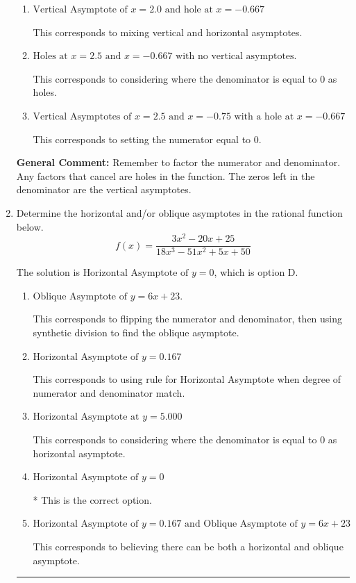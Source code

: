 \documentclass{extbook}[14pt]
\newcommand{\litem}[1]{\item #1

\rule{\textwidth}{0.4pt}}
\begin{document}
\begin{enumerate}
{\begin{enumerate}[label=\Alph*.]
This is the correct answer.
\item \( \text{Vertical Asymptote of } x = 2.0 \text{ and hole at } x = -0.667 \)

This corresponds to mixing vertical and horizontal asymptotes.
\item \( \text{Holes at } x = 2.5 \text{ and } x = -0.667 \text{ with no vertical asymptotes.} \)

This corresponds to considering where the denominator is equal to 0 as holes.
\item \( \text{Vertical Asymptotes of } x = 2.5 \text{ and } x = -0.75 \text{ with a hole at } x = -0.667 \)

This corresponds to setting the numerator equal to 0.
\end{enumerate}

\textbf{General Comment:} Remember to factor the numerator and denominator. Any factors that cancel are holes in the function. The zeros left in the denominator are the vertical asymptotes.
}
\litem{
Determine the horizontal and/or oblique asymptotes in the rational function below.
\[ f(x) = \frac{3x^{2} -20 x + 25}{18x^{3} -51 x^{2} +5 x + 50} \]

The solution is \( \text{Horizontal Asymptote of } y = 0 \), which is option D.\begin{enumerate}[label=\Alph*.]
\item \( \text{Oblique Asymptote of } y = 6x + 23. \)

This corresponds to flipping the numerator and denominator, then using synthetic division to find the oblique asymptote.
\item \( \text{Horizontal Asymptote of } y = 0.167  \)

This corresponds to using rule for Horizontal Asymptote when degree of numerator and denominator match.
\item \( \text{Horizontal Asymptote at } y = 5.000 \)

This corresponds to considering where the denominator is equal to 0 as horizontal asymptote.
\item \( \text{Horizontal Asymptote of } y = 0 \)

* This is the correct option.
\item \( \text{Horizontal Asymptote of } y = 0.167 \text{ and Oblique Asymptote of } y = 6x + 23 \)

This corresponds to believing there can be both a horizontal and oblique asymptote.
\end{enumerate}

}
\end{enumerate}
\end{document}
